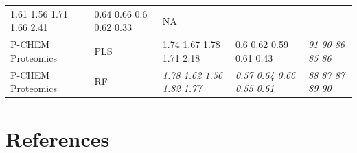 \documentclass[utf8]{frontiersHLTH} %
\begin{document}
\begin{longtable}[]{@{}lllll@{}}
\begin{minipage}[t]{0.19\columnwidth}
1.61 1.56 1.71 1.66 2.41\strut
\end{minipage} & \begin{minipage}[t]{0.19\columnwidth}\raggedright\strut
0.64 0.66 0.6 0.62 0.33\strut
\end{minipage} & \begin{minipage}[t]{0.27\columnwidth}\raggedright\strut
NA\strut
\end{minipage}\tabularnewline
\begin{minipage}[t]{0.13\columnwidth}\raggedright\strut
P-CHEM Proteomics\strut
\end{minipage} & \begin{minipage}[t]{0.08\columnwidth}\raggedright\strut
PLS\strut
\end{minipage} & \begin{minipage}[t]{0.19\columnwidth}\raggedright\strut
1.74 1.67 1.78 1.71 2.18\strut
\end{minipage} & \begin{minipage}[t]{0.19\columnwidth}\raggedright\strut
0.6 0.62 0.59 0.61 0.43\strut
\end{minipage} & \begin{minipage}[t]{0.27\columnwidth}\raggedright\strut
\emph{91 90 86 85 86}\strut
\end{minipage}\tabularnewline
\begin{minipage}[t]{0.13\columnwidth}\raggedright\strut
P-CHEM Proteomics\strut
\end{minipage} & \begin{minipage}[t]{0.08\columnwidth}\raggedright\strut
RF\strut
\end{minipage} & \begin{minipage}[t]{0.19\columnwidth}\raggedright\strut
\emph{1.78 1.62 1.56 1.82 1.77}\strut
\end{minipage} & \begin{minipage}[t]{0.19\columnwidth}\raggedright\strut
\emph{0.57 0.64 0.66 0.55 0.61}\strut
\end{minipage} & \begin{minipage}[t]{0.27\columnwidth}\raggedright\strut
\emph{88 87 87 89 90}\strut
\end{minipage}\tabularnewline
\bottomrule
\end{longtable}

\section*{References}\label{references}
\end{document}

